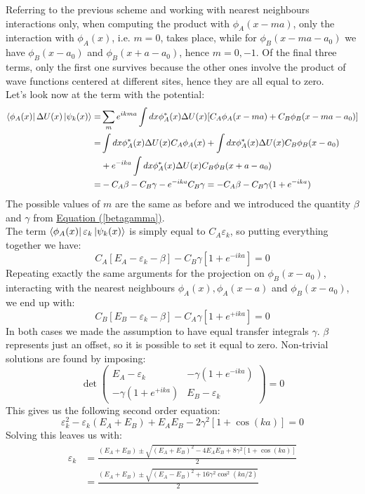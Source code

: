 \documentclass[10.75pt,a4paper,openright,bottom=2cm]{article}
\renewcommand{\refeq}[1]{\hyperref[#1]{Equation (\ref{#1})}}
\begin{document}
Referring to the previous scheme and working with nearest neighbours interactions only, when computing the product with $\phi_A(x-ma)$, only the interaction with $\phi_A(x)$, i.e. $m=0$, takes place, while for $\phi_B(x-ma-a_0)$ we have $\phi_B(x-a_0)$ and $\phi_B(x+a-a_0)$, hence $m=0,-1$. Of the final three terms, only the first one survives because the other ones involve the product of wave functions centered at different sites, hence they are all equal to zero.\\
Let's look now at the term with the potential:
\begin{align*}
\bra{\phi_A(x)}\Delta U(x)\ket{\psi_k(x)}=&\sum_me^{ikma}\int dx\phi_A^*(x)\Delta U(x)[C_A\phi_A(x-ma)+C_B\phi_B(x-ma-a_0)]\\
=&\int dx\phi_A^*(x)\Delta U(x)C_A\phi_A(x)+\int dx\phi_A^*(x)\Delta U(x)C_B\phi_B(x-a_0)\\
&+e^{-ika}\int dx\phi_A^*(x)\Delta U(x)C_B\phi_B(x+a-a_0)\\
=&-C_A\beta-C_B\gamma-e^{-ika}C_B\gamma=-C_A\beta-C_B\gamma(1+e^{-ika})
\end{align*}
The possible values of $m$ are the same as before and we introduced the quantity $\beta$ and $\gamma$ from \refeq{betagamma}.\\
The term $\bra{\phi_A(x)}\varepsilon_k\ket{\psi_k(x)}$ is simply equal to $C_A\varepsilon_k$, so putting everything together we have:
\[
C_A[E_A-\varepsilon_k-\beta]-C_B\gamma[1+e^{-ika}]=0
\]
Repeating exactly the same arguments for the projection on $\phi_B(x-a_0)$, interacting with the nearest neighbours $\phi_A(x), \phi_A(x-a)$ and $\phi_B(x-a_0)$, we end up with:
\[
C_B[E_B-\varepsilon_k-\beta]-C_A\gamma[1+e^{+ika}]=0
\]
In both cases we made the assumption to have equal transfer integrals $\gamma$. $\beta$ represents just an offset, so it is possible to set it equal to zero. Non-trivial solutions are found by imposing:
\[
\det\left(\begin{array}{cc}
    E_A-\varepsilon_k & -\gamma(1+e^{-ika}) \\
    -\gamma(1+e^{+ika}) & E_B-\varepsilon_k
\end{array}\right)=0
\]
This gives us the following second order equation:
\[
\varepsilon_k^2-\varepsilon_k(E_A+E_B)+E_AE_B-2\gamma^2[1+\cos(ka)]=0
\]
Solving this leaves us with:
\begin{align*}
\varepsilon_k&=\frac{(E_A+E_B)\pm\sqrt{(E_A+E_B)^2-4E_AE_B+8\gamma^2[1+\cos(ka)]}}{2}\\
&=\frac{(E_A+E_B)\pm\sqrt{(E_A-E_B)^2+16\gamma^2\cos^2(ka/2)}}{2}
\end{align*}
\end{document}
